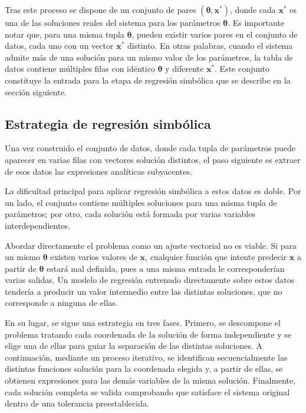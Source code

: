 \documentclass{article} \usepackage[utf8]{inputenc} \usepackage[spanish]{babel} \spanishdecimal{.} \usepackage{amsmath, amssymb, amsthm} \usepackage{bm} \usepackage{float} \usepackage{longtable} \usepackage[hidelinks]{hyperref}
\newcommand{\xvec}{\mathbf{x}} \newcommand{\thetavec}{\boldsymbol{\theta}} \newcommand{\Fvec}{\mathbf{F}} \newcommand{\R}{\mathbb{R}} \newcommand{\norm}[1]{\left\lVert#1\right\rVert} \newcommand{\loss}{\mathcal{L}} \newcommand{\dataset}{\mathcal{D}} \newcommand{\jac}{\mathbf{J}}
\begin{document}
Tras este proceso se dispone de un conjunto de pares
\((\thetavec, \xvec^*)\), donde cada \(\xvec^*\) es una de las
soluciones reales del sistema para los parámetros \(\thetavec\). Es
importante notar que, para una misma tupla \(\thetavec\), pueden
existir varios pares en el conjunto de datos, cada uno con un vector
\(\xvec^*\) distinto. En otras palabras, cuando el sistema admite más
de una solución para un mismo valor de los parámetros, la tabla de
datos contiene múltiples filas con idéntico \(\thetavec\) y diferente
\(\xvec^*\). Este conjunto constituye la entrada para la etapa de
regresión simbólica que se describe en la sección siguiente.


\subsection{Estrategia de regresión simbólica}
\label{sec:estrategia_sr}

Una vez construido el conjunto de datos, donde cada tupla de parámetros
puede aparecer en varias filas con vectores solución distintos, el paso
siguiente es extraer de esos datos las expresiones analíticas
subyacentes.

La dificultad principal para aplicar regresión simbólica a estos datos
es doble. Por un lado, el conjunto contiene múltiples soluciones para
una misma tupla de parámetros; por otro, cada solución está formada por
varias variables interdependientes.

Abordar directamente el problema como un ajuste vectorial no es viable.
Si para un mismo \(\thetavec\) existen varios valores de \(\xvec\),
cualquier función que intente predecir \(\xvec\) a partir de
\(\thetavec\) estará mal definida, pues a una misma entrada le
corresponderían varias salidas. Un modelo de regresión entrenado
directamente sobre estos datos tendería a producir un valor intermedio
entre las distintas soluciones, que no corresponde a ninguna de ellas.

En su lugar, se sigue una estrategia en tres fases. Primero, se
descompone el problema tratando cada coordenada de la solución de forma
independiente y se elige una de ellas para guiar la separación de las
distintas soluciones. A continuación, mediante un proceso iterativo, se
identifican secuencialmente las distintas funciones solución para la
coordenada elegida y, a partir de ellas, se obtienen expresiones para
las demás variables de la misma solución. Finalmente, cada solución
completa se valida comprobando que satisface el sistema original dentro
de una tolerancia preestablecida.
\end{document}
